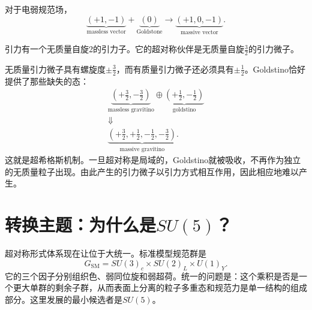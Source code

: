 对于电弱规范场，
\begin{equation}
\underbrace{(+1,-1)}_{\text{massless vector}}
+
\underbrace{(0)}_{\text{Goldstone}}
\longrightarrow
\underbrace{(+1,0,-1)}_{\text{massive vector}}.
\label{eq:l9-higgs-count}
\end{equation}

\begin{classroomqa}
\end{classroomqa}

引力有一个无质量自旋2的引力子。它的超对称伙伴是无质量自旋\(\tfrac32\)的引力微子。

\begin{classroomqa}
\end{classroomqa}

无质量引力微子具有螺旋度\(\pm\tfrac32\)，而有质量引力微子还必须具有\(\pm\tfrac12\)。Goldstino恰好提供了那些缺失的态：
\begin{equation}
\begin{gathered}
\underbrace{\left(+\frac32,-\frac32\right)}_{\text{massless gravitino}}
\oplus
\underbrace{\left(+\frac12,-\frac12\right)}_{\text{goldstino}}\\
\Downarrow\\
\underbrace{\left(+\frac32,+\frac12,-\frac12,-\frac32\right)}_{\text{massive gravitino}}.
\end{gathered}
\label{eq:l9-super-higgs}
\end{equation}
这就是超希格斯机制。一旦超对称是局域的，Goldstino就被吸收，不再作为独立的无质量粒子出现。由此产生的引力微子以引力方式相互作用，因此相应地难以产生。

\section{转换主题：为什么是\texorpdfstring{\(SU(5)\)}{SU(5)}？}

超对称形式体系现在让位于大统一。标准模型规范群是
\begin{equation}
G_{\mathrm{SM}}
=SU(3)_c\times SU(2)_L\times U(1)_Y.
\label{eq:l9-sm-group}
\end{equation}
它的三个因子分别组织色、弱同位旋和弱超荷。统一的问题是：这个乘积是否是一个更大单群的剩余子群，从而表面上分离的粒子多重态和规范力是单一结构的组成部分。这里发展的最小候选者是\(SU(5)\)。

